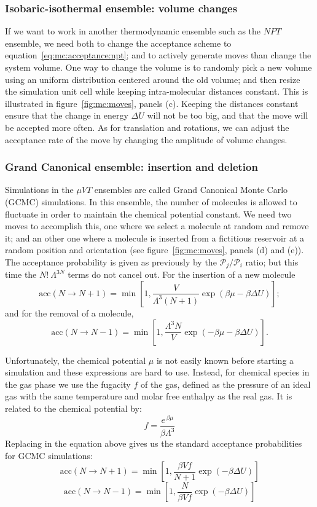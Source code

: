 \documentclass[thesis]{subfiles}
\begin{document}
\subsubsection{Isobaric-isothermal ensemble: volume changes}

If we want to work in another thermodynamic ensemble such as the $NPT$ ensemble,
we need both to change the acceptance scheme to
equation~\eqref{eq:mc:acceptance:npt}; and to actively generate moves than
change the system volume. One way to change the volume is to randomly pick a new
volume using an uniform distribution centered around the old volume; and then
resize the simulation unit cell while keeping intra-molecular distances
constant. This is illustrated in figure~\ref{fig:mc:moves}, panels (c).  Keeping
the distances constant ensure that the change in energy $\Delta U$ will not be
too big, and that the move will be accepted more often.  As for translation and
rotations, we can adjust the acceptance rate of the move by changing the
amplitude of volume changes.

\subsubsection{Grand Canonical ensemble: insertion and deletion}

Simulations in the $\mu VT$ ensembles are called Grand Canonical Monte Carlo
(GCMC) simulations. In this ensemble, the number of molecules is allowed to
fluctuate in order to maintain the chemical potential constant. We need two
moves to accomplish this, one where we select a molecule at random and remove
it; and an other one where a molecule is inserted from a fictitious reservoir at
a random position and orientation (see figure~\ref{fig:mc:moves}, panels (d) and
(e)). The acceptance probability is given as previously by the $\mathcal{P}_j /
\mathcal{P}_i$ ratio; but this time the $N!\ \Lambda^{3N}$ terms do not cancel
out. For the insertion of a new molecule
\[ \text{acc}(N \to N + 1) = \min\left[1, \frac{V}{\Lambda^3 (N + 1)} \exp\left(\beta \mu - \beta \Delta U \right)\right]; \]
and for the removal of a molecule,
\[ \text{acc}(N \to N - 1) = \min\left[1, \frac{\Lambda^3 N}{V} \exp\left(-\beta \mu - \beta \Delta U \right)\right]. \]

Unfortunately, the chemical potential $\mu$ is not easily known before starting
a simulation and these expressions are hard to use. Instead, for chemical
species in the gas phase we use the fugacity $f$ of the gas, defined as the
pressure of an ideal gas with the same temperature and molar free enthalpy as
the real gas. It is related to the chemical potential by:
\[ f = \frac{e^{\,\beta \mu}}{\beta \Lambda^3}\]
Replacing in the equation above gives us the standard acceptance probabilities
for GCMC simulations:
\[ \text{acc}(N \to N + 1) = \min\left[1, \frac{\beta V f}{N + 1} \exp\left(- \beta \Delta U \right)\right] \]
\[ \text{acc}(N \to N - 1) = \min\left[1, \frac{N}{\beta V f} \exp\left(- \beta \Delta U \right)\right] \]
\end{document}
